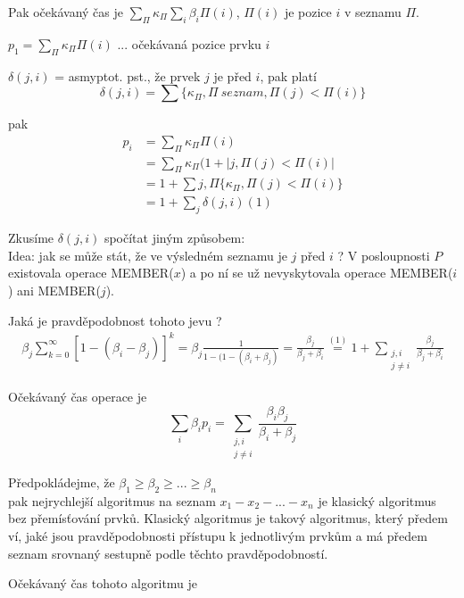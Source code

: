 Pak očekávaný čas je $\sum_{\Pi}{\kappa}_{\Pi}\sum_{i}{\beta}_i\Pi(i)$, 
$\Pi(i)$ je pozice $i$ v seznamu $\Pi$.
\par
$p_1 = \sum_{\Pi}{\kappa}_{\Pi}\Pi(i)$ ... očekávaná pozice prvku $i$
\par
$\delta(j,i)$ = asmyptot. pst., že prvek $j$ je před $i$, pak platí \\
$$
\delta(j,i) = \sum\{\kappa_\Pi , \Pi\ seznam, \Pi(j) < \Pi(i)\}
$$

pak 
\begin{equation}
\begin{split}
p_i & = \sum_{\Pi}\kappa_\Pi\Pi(i) \\
& = \sum_{\Pi}\kappa_\Pi(1 + |{j, \Pi(j) < \Pi(i)|} \\
& = 1 + \sum{j,\Pi}\{\kappa_\Pi, \Pi(j) < \Pi(i)\} \\
& = 1 + \sum_{j}\delta(j,i) (1)
\end{split}
\end{equation}

Zkusíme $\delta(j,i)$ spočítat jiným způsobem: \\
Idea: jak se může stát, že ve výsledném seznamu je $j$ před $i$ ?
V posloupnosti $P$ existovala operace MEMBER($x$) a po ní se už nevyskytovala
operace MEMBER($i$) ani MEMBER($j$).
\par

Jaká je pravděpodobnost tohoto jevu ?
\begin{multline}
\beta_j\sum_{k=0}^{\infty}[1 - (\beta_i - \beta_j)]^k 
= \beta_j \frac{1}{1-(1-(\beta_i+\beta_j)} 
= \frac{\beta_j}{\beta_j+\beta_i} \stackrel{(1)}{=} 
1 + \sum_{\substack{j,i\\j \ne i}} \frac{\beta_j}{\beta_j+\beta_i}
\end{multline}

Očekávaný čas operace  je 
$$
\sum_{i} \beta_i p_i 
= \sum_{\substack{j,i\\j \ne i}} \frac{\beta_i\beta_j}{\beta_i+\beta_j}
$$

Předpokládejme, že $\beta_1 \geq \beta_2 \geq ... \geq \beta_n$ \\
pak nejrychlejší algoritmus na seznam $x_1 - x_2 - ... - x_n$ je klasický
algoritmus bez přemísťování prvků. Klasický algoritmus je takový
algoritmus, který předem ví, jaké jsou pravděpodobnosti
přístupu k jednotlivým prvkům a má předem seznam srovnaný 
sestupně podle těchto pravděpodobností.
\par
Očekávaný čas tohoto algoritmu je 

